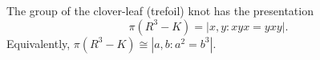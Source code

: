 The group of the clover-leaf (trefoil) knot has the presentation
$$\pi(R^3 - K) = |x, y : xyx = yxy|.$$
Equivalently, $\pi(R^3 - K) \cong |a, b : a^2 = b^3|$.
